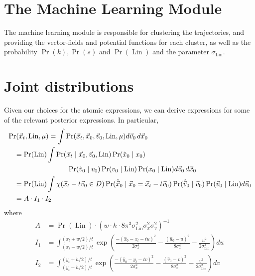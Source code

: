 \documentclass[12pt]{amsart}
\DeclareMathOperator{\Lin}{Lin}
\begin{document}
\section{The Machine Learning Module}
\label{app:learning}
The machine learning module is responsible for clustering the trajectories, and providing the vector-fields and potential functions for each cluster, as well as the probability $\Pr(k), \Pr(s)$ and $\Pr( \Lin)$ and the parameter $\sigma_{\Lin}$.

\section{Joint distributions}
Given our choices for the atomic expressions, we can derive expressions for some of the relevant posterior expressions.
In particular,
\begin{align*}
	&\Pr( \vec{x}_t , \Lin,  \mu ) = \int \Pr( \vec{x}_t, \vec{x}_0, \vec{v}_0 , \Lin, \mu) d\vec{v}_0\, d\vec{x}_0 \\
	&\quad= \Pr(\Lin) \int \Pr(\vec{x}_t \mid \vec{x}_0, \vec{v}_0 , \Lin ) \Pr( \hat{x}_0 \mid x_0)\\
	&\hspace{20ex} \Pr(\hat{v}_0 \mid v_0 ) \Pr( v_0 \mid \Lin ) \Pr( x_0 \mid \Lin )d\vec{v}_0\, d\vec{x}_0 \\
	&\quad= \Pr(\Lin) \int \chi( \vec{x}_t - t\vec{v}_0 \in D) \Pr( \hat{\vec{x}}_0 \mid \vec{x}_0 = \vec{x}_t - t \vec{v}_0 ) \Pr(\hat{\vec{v}}_0 \mid \vec{v}_0 ) \Pr( \vec{v}_0 \mid \Lin ) d\vec{v}_0 \\
	&\quad= A \cdot I_1 \cdot I_2
\end{align*}
where
\begin{align*}
	A &= \Pr(\Lin) \cdot (w\cdot h \cdot 8\pi^3 \sigma_{\Lin}^2 \sigma_x^2 \sigma_v^2 )^{-1} \\
	I_1 &=  \int_{(x_t-w/2)/t}^{(x_t+w/2)/t}   \exp \left( \frac{-(\hat{x}_0 - x_t - t u )^2}{2 \sigma_x^2} -  \frac{(\hat{u}_0 - u)^2}{8\sigma_x^2} - \frac{ u^2}{2 \sigma_{\Lin}^2} \right) du \\
	I_2 &=  \int_{(y_t-h/2)/t}^{(y_t+h/2)/t}   \exp \left( \frac{-(\hat{y}_0 - y_t - t v )^2}{2 \sigma_x^2} -  \frac{(\hat{v}_0 - v)^2}{8\sigma_x^2} - \frac{ v^2}{2 \sigma_{\Lin}^2} \right) dv
\end{align*}
\end{document}
